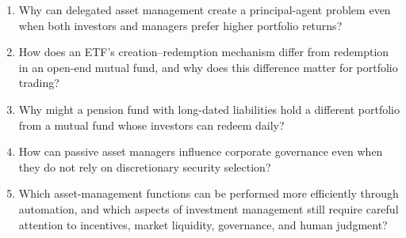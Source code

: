 \begin{enumerate}

\item Why can delegated asset management create a principal-agent problem even when both investors and managers prefer higher portfolio returns?

\item How does an ETF's creation--redemption mechanism differ from redemption in an open-end mutual fund, and why does this difference matter for portfolio trading?

\item Why might a pension fund with long-dated liabilities hold a different portfolio from a mutual fund whose investors can redeem daily?

\item How can passive asset managers influence corporate governance even when they do not rely on discretionary security selection?

\item Which asset-management functions can be performed more
efficiently through automation, and which aspects of investment management still require careful attention to incentives, market liquidity, governance, and human judgment?

\end{enumerate}



